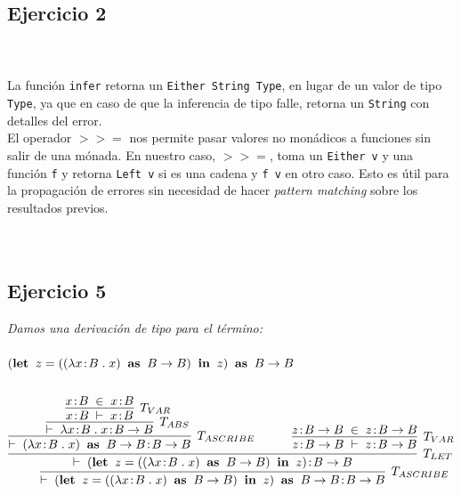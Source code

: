 \documentclass[a4paper,10pt]{article}
\begin{document}
\subsection*{Ejercicio 2} 
	\emph{}
	\\
	\\
	La función \texttt{infer} retorna un \texttt{Either String Type}, en lugar de un valor de tipo \texttt{Type}, ya que en caso de que la inferencia de tipo falle, retorna un \texttt{String} con detalles del error.
	\\
	El operador $>>=$ nos permite pasar valores no monádicos a funciones sin salir de una mónada. En nuestro caso, $>>=$, toma un \texttt{Either v} y una función \texttt{f} y retorna \texttt{Left v} si es una cadena y \texttt{f v} en otro caso. Esto es útil para la propagación de errores sin necesidad de hacer \emph{pattern matching} sobre los resultados previos.
	\\
	\\
	\\
\subsection*{Ejercicio 5} 
	\emph{Damos una derivación de tipo para el término:
		\\
		\\ 
		\indent $({\bf let}\;\;z=((\lambda x\!:\!B\;.\;x)\;\;{\bf as}\;\;B \rightarrow B)\;\;{\bf in}\;\;z)\;\;{\bf as}\;\;B \rightarrow B$
	}
	\\
	\\
	\begin{align*}
		\infer[T_{ASCRIBE}]{
			\vdash \; ({\bf let}\;\;z=((\lambda x\!:\!B\;.\;x)\;\;{\bf as}\;\;B \rightarrow B)\;\;{\bf in}\;\;z)\;\;{\bf as}\;\;B \rightarrow B\!:\!B \rightarrow B
		}{
			\infer[T_{LET}]
			{
				\vdash \; ({\bf let}\;\;z=((\lambda x\!:\!B\;.\;x)\;\;{\bf as}\;\;B \rightarrow B)\;\;{\bf in}\;\;z)\!:\!B \rightarrow B
			}{
				\infer[T_{ASCRIBE}]
				{
					\vdash \; (\lambda x\!:\!B\;.\;x)\;\;{\bf as}\;\;B \rightarrow B\!:\!B \rightarrow B
				}
				{
					\infer[T_{ABS}]
					{
						\vdash \; \lambda x\!:\!B\;.\;x\!:\!B \rightarrow B
					}
					{
						\infer[T_{VAR}]
						{
							x\!:\!B \; \vdash \; x\!:\!B
						}
						{
							x\!:\!B \; \in \; x\!:\!B
						}
					}
				} & \qquad
				\infer[T_{VAR}]
				{
					z\!:\!B \rightarrow B\; \vdash \;z\!:\!B \rightarrow B
				}
				{
					z\!:\!B \rightarrow B\; \in \;z\!:\!B \rightarrow B
				}
			}
		}
	\end{align*}
	\\
	\\
	\\
	
\end{document}
